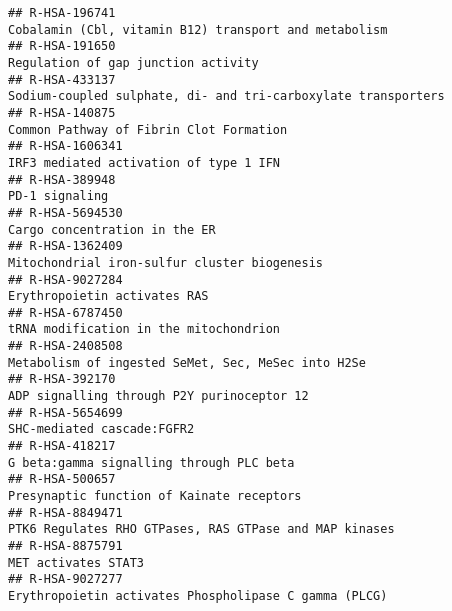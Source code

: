 \documentclass[
]{article}
\begin{document}
\begin{verbatim}
## R-HSA-196741                                                                                 Cobalamin (Cbl, vitamin B12) transport and metabolism
## R-HSA-191650                                                                                                   Regulation of gap junction activity
## R-HSA-433137                                                                         Sodium-coupled sulphate, di- and tri-carboxylate transporters
## R-HSA-140875                                                                                               Common Pathway of Fibrin Clot Formation
## R-HSA-1606341                                                                                               IRF3 mediated activation of type 1 IFN
## R-HSA-389948                                                                                                                        PD-1 signaling
## R-HSA-5694530                                                                                                        Cargo concentration in the ER
## R-HSA-1362409                                                                                         Mitochondrial iron-sulfur cluster biogenesis
## R-HSA-9027284                                                                                                         Erythropoietin activates RAS
## R-HSA-6787450                                                                                               tRNA modification in the mitochondrion
## R-HSA-2408508                                                                                   Metabolism of ingested SeMet, Sec, MeSec into H2Se
## R-HSA-392170                                                                                            ADP signalling through P2Y purinoceptor 12
## R-HSA-5654699                                                                                                           SHC-mediated cascade:FGFR2
## R-HSA-418217                                                                                              G beta:gamma signalling through PLC beta
## R-HSA-500657                                                                                             Presynaptic function of Kainate receptors
## R-HSA-8849471                                                                               PTK6 Regulates RHO GTPases, RAS GTPase and MAP kinases
## R-HSA-8875791                                                                                                                  MET activates STAT3
## R-HSA-9027277                                                                                Erythropoietin activates Phospholipase C gamma (PLCG)

\end{verbatim}
\end{document}
